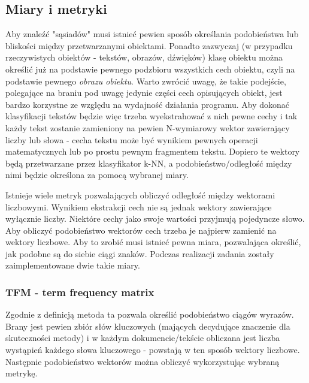 \documentclass{classrep}
\begin{document}
{        \subsection{Miary i metryki} \label{miary_metryki} {
            Aby znaleźć "sąsiadów" musi istnieć pewien sposób określania podobieństwa lub bliskości
            między przetwarzanymi obiektami. Ponadto zazwyczaj (w przypadku rzeczywistych obiektów - tekstów,
            obrazów, dźwięków) klasę obiektu można określić już na podstawie pewnego podzbioru wszystkich cech
            obiektu, czyli na podstawie pewnego \emph{obrazu obiektu}. Warto zwrócić uwagę, że takie podejście,
            polegające na braniu pod uwagę jedynie części cech opisujących obiekt, jest bardzo korzystne ze
            względu na wydajność działania programu. Aby dokonać klasyfikacji tekstów będzie więc trzeba wyekstrahować
            z nich pewne cechy i tak każdy tekst zostanie zamieniony na pewien N-wymiarowy wektor zawierający liczby lub
            słowa - cecha tekstu może być wynikiem pewnych operacji matematycznych lub po prostu pewnym fragmentem tekstu.
            Dopiero te wektory będą przetwarzane przez klasyfikator k-NN, a podobieństwo/odległość między nimi będzie
            określona za pomocą wybranej miary.

            Istnieje wiele metryk pozwalających obliczyć odległość między wektorami liczbowymi. Wynikiem ekstrakcji
            cech nie są jednak wektory zawierające wyłącznie liczby. Niektóre cechy jako swoje wartości przyjmują
            pojedyncze słowo. Aby obliczyć podobieństwo wektorów cech trzeba je najpierw zamienić na wektory liczbowe.
            Aby to zrobić musi istnieć pewna miara, pozwalająca określić, jak podobne są do siebie ciągi znaków. Podczas
            realizacji zadania zostały zaimplementowane dwie takie miary.

            \subsubsection{TFM - term frequency matrix} \label{tfm} {
                Zgodnie z definicją metoda ta pozwala określić podobieństwo ciągów wyrazów. Brany jest pewien zbiór słów
                kluczowych (mających decydujące znaczenie dla skuteczności metody) i w każdym dokumencie/tekście obliczana
                jest liczba wystąpień każdego słowa kluczowego - powstają w ten sposób wektory liczbowe. Następnie
                podobieństwo wektorów można obliczyć wykorzystując wybraną metrykę.

}}}
\end{document}
